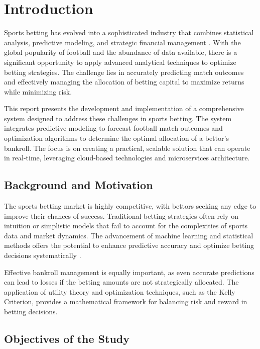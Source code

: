 

\chapter{Introduction}

Sports betting has evolved into a sophisticated industry that combines statistical analysis, predictive modeling, and strategic financial management \cite{AndersonSally2013}. With the global popularity of football and the abundance of data available, there is a significant opportunity to apply advanced analytical techniques to optimize betting strategies. The challenge lies in accurately predicting match outcomes and effectively managing the allocation of betting capital to maximize returns while minimizing risk.

This report presents the development and implementation of a comprehensive system designed to address these challenges in sports betting. The system integrates predictive modeling to forecast football match outcomes and optimization algorithms to determine the optimal allocation of a bettor's bankroll. The focus is on creating a practical, scalable solution that can operate in real-time, leveraging cloud-based technologies and microservices architecture.

\section{Background and Motivation}

The sports betting market is highly competitive, with bettors seeking any edge to improve their chances of success. Traditional betting strategies often rely on intuition or simplistic models that fail to account for the complexities of sports data and market dynamics. The advancement of machine learning and statistical methods offers the potential to enhance predictive accuracy and optimize betting decisions systematically \cite{CainEtAl2000}.

Effective bankroll management is equally important, as even accurate predictions can lead to losses if the betting amounts are not strategically allocated. The application of utility theory and optimization techniques, such as the Kelly Criterion, provides a mathematical framework for balancing risk and reward in betting decisions. 

\section{Objectives of the Study}

